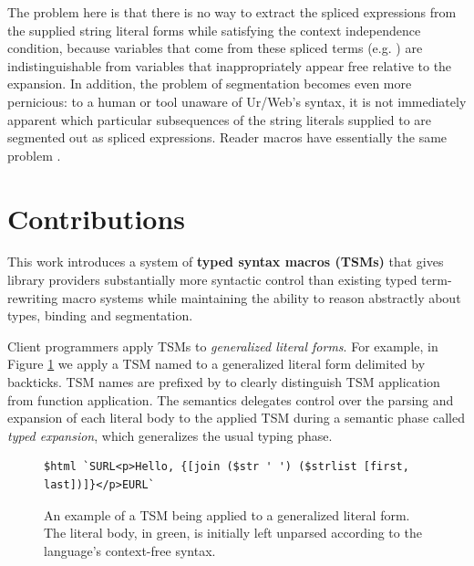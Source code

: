 The problem here is that there is no way to extract the spliced expressions from the supplied string literal forms while satisfying the context independence condition, because variables that come from these spliced terms (e.g. ) are indistinguishable from variables that inappropriately appear free relative to the expansion. In addition, the problem of segmentation becomes even more pernicious: to a human or tool unaware of Ur/Web's syntax, it is not immediately apparent which particular subsequences of the string literals supplied to  are segmented out as spliced expressions. Reader macros have essentially the same problem  \cite{DBLP:journals/jfp/FlattCDF12}.

\section{Contributions}\label{sec:contributions}

This work introduces a system of \textbf{typed syntax macros (TSMs)} that gives library providers substantially more syntactic control than existing typed term-rewriting macro systems while maintaining the ability to reason abstractly about types, binding and segmentation.%

Client programmers apply TSMs to \emph{generalized literal forms}. For example, in Figure \ref{fig:first-tsm-example} we apply a TSM named  to a generalized literal form delimited by backticks. TSM names are prefixed by \li{#\dolla#} to clearly distinguish TSM application from function application. The semantics delegates control over the parsing and expansion of each literal body to the applied TSM during a semantic phase called \emph{typed expansion}, which generalizes the usual typing phase. 
\begin{figure}[ht!]
\begin{lstlisting}[numbers=none,xleftmargin=0px]
$html `SURL<p>Hello, {[join ($str ' ') ($strlist [first, last])]}</p>EURL`
\end{lstlisting}
\caption[An example of a TSM being applied to a generalized literal form]{An example of a TSM being applied to a generalized literal form. The literal body, in green, is initially left unparsed according to the language's context-free syntax.}
\label{fig:first-tsm-example}
\end{figure}


